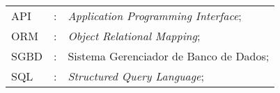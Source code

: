 \cleardoublepage
{}
\begin{tabular}{lcl}

API & : & \textit{Application Programming Interface};\\
ORM & : & \textit{Object Relational Mapping};\\
SGBD & : & Sistema Gerenciador de Banco de Dados;\\
SQL & : & \textit{Structured Query Language};\\
\end{tabular}
